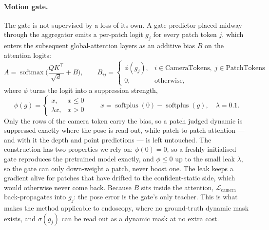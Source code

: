 \documentclass[11pt]{article}
\begin{document}
\paragraph{Motion gate.}
The gate is not supervised by a loss of its own. A gate predictor placed midway through the
aggregator emits a per-patch logit $g_j$ for every patch token $j$, which enters the
subsequent global-attention layers as an additive bias $B$ on the attention logits:
\begin{equation}
  A = \operatorname{softmax}\!\Big( \frac{QK^{\top}}{\sqrt{d}} + B \Big),
  \qquad
  B_{ij} =
  \begin{cases}
    \phi(g_j), & i \in \text{CameraTokens},\; j \in \text{PatchTokens} \\[2pt]
    0,         & \text{otherwise,}
  \end{cases}
\end{equation}
where $\phi$ turns the logit into a suppression strength,
\begin{equation}
  \phi(g) =
  \begin{cases}
    x,          & x \le 0 \\
    \lambda x,  & x > 0
  \end{cases}
  \qquad
  x = \operatorname{softplus}(0) - \operatorname{softplus}(g),
  \quad \lambda = 0.1 .
\end{equation}
Only the rows of the camera token carry the bias, so a patch judged dynamic is suppressed
exactly where the pose is read out, while patch-to-patch attention --- and with it the depth
and point predictions --- is left untouched. The construction has two properties we rely on:
$\phi(0) = 0$, so a freshly initialised gate reproduces the pretrained model exactly, and
$\phi \le 0$ up to the small leak $\lambda$, so the gate can only down-weight a patch, never
boost one. The leak keeps a gradient alive for patches that have drifted to the confident-static
side, which would otherwise never come back. Because $B$ sits inside the attention,
$\mathcal{L}_{\text{camera}}$ back-propagates into $g_j$: the pose error is the gate's only
teacher. This is what makes the method applicable to endoscopy, where no ground-truth dynamic
mask exists, and $\sigma(g_j)$ can be read out as a dynamic mask at no extra cost.
\end{document}

